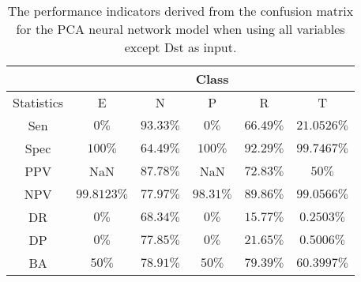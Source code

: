 \begin{table}[!ht]
	\centering
	\begin{tabular}{|c|c|c|c|c|c|}
		\hline
		 & \multicolumn{5}{c|}{Class} \\ \hline
		Statistics & E & N & P & R & T \\ \hline
		Sen & $0\%$ & $93.33\%$ & $0\%$ & $66.49\%$ & $21.0526\%$ \\ \hline
		Spec & $100\%$ & $64.49\%$ & $100\%$ & $92.29\%$ & $99.7467\%$ \\ \hline
		PPV & NaN & $87.78\%$ & NaN & $72.83\%$ & $50\%$ \\ \hline
		NPV & $99.8123\%$ & $77.97\%$ & $98.31\%$ & $89.86\%$ & $99.0566\%$ \\ \hline
		DR & $0\%$ & $68.34\%$ & $0\%$ & $15.77\%$ & $0.2503\%$ \\ \hline
		DP & $0\%$ & $77.85\%$ & $0\%$ & $21.65\%$ & $0.5006\%$ \\ \hline
		BA & $50\%$ & $78.91\%$ & $50\%$ & $79.39\%$ & $60.3997\%$ \\ \hline
	\end{tabular}
	\caption{The performance indicators derived from the confusion matrix for the PCA neural network model when using all variables except Dst as input.}
	\label{tab:cs:reverse:noDst:pcaNNet}
\end{table}
